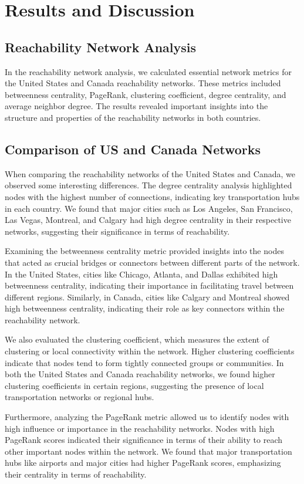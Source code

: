 \section{Results and Discussion}

\subsection{Reachability Network Analysis}

In the reachability network analysis, we calculated essential network metrics for the United States and Canada reachability networks. These metrics included betweenness centrality, PageRank, clustering coefficient, degree centrality, and average neighbor degree. The results revealed important insights into the structure and properties of the reachability networks in both countries.

\subsection{Comparison of US and Canada Networks}

When comparing the reachability networks of the United States and Canada, we observed some interesting differences. The degree centrality analysis highlighted nodes with the highest number of connections, indicating key transportation hubs in each country. We found that major cities such as Los Angeles, San Francisco, Las Vegas, Montreal, and Calgary had high degree centrality in their respective networks, suggesting their significance in terms of reachability.

Examining the betweenness centrality metric provided insights into the nodes that acted as crucial bridges or connectors between different parts of the network. In the United States, cities like Chicago, Atlanta, and Dallas exhibited high betweenness centrality, indicating their importance in facilitating travel between different regions. Similarly, in Canada, cities like Calgary and Montreal showed high betweenness centrality, indicating their role as key connectors within the reachability network.

We also evaluated the clustering coefficient, which measures the extent of clustering or local connectivity within the network. Higher clustering coefficients indicate that nodes tend to form tightly connected groups or communities. In both the United States and Canada reachability networks, we found higher clustering coefficients in certain regions, suggesting the presence of local transportation networks or regional hubs.

Furthermore, analyzing the PageRank metric allowed us to identify nodes with high influence or importance in the reachability networks. Nodes with high PageRank scores indicated their significance in terms of their ability to reach other important nodes within the network. We found that major transportation hubs like airports and major cities had higher PageRank scores, emphasizing their centrality in terms of reachability.
